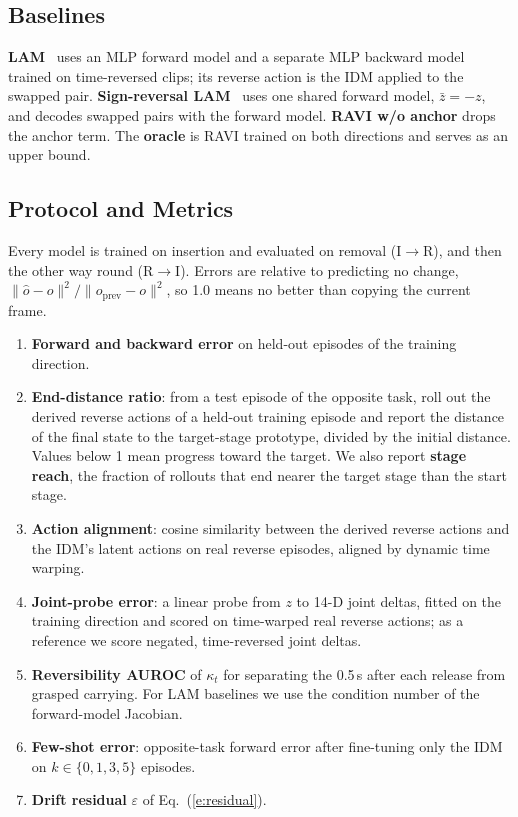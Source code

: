 \documentclass{jcse}
\newcommand{\method}{RAVI}
\newcommand{\zb}{\bar{z}}
\begin{document}
\subsection{Baselines}
\textbf{LAM}~\cite{schmidt2024lapo} uses an MLP forward model and a separate MLP backward model trained on time-reversed clips; its reverse action is the IDM applied to the swapped pair.
\textbf{Sign-reversal LAM}~\cite{tang2026alam} uses one shared forward model, $\zb=-z$, and decodes swapped pairs with the forward model.
\textbf{{\method} w/o anchor} drops the anchor term.
The \textbf{oracle} is {\method} trained on both directions and serves as an upper bound.

\subsection{Protocol and Metrics}
Every model is trained on insertion and evaluated on removal (I$\to$R), and then the other way round (R$\to$I).
Errors are relative to predicting no change, $\|\hat o-o\|^2/\|o_{\mathrm{prev}}-o\|^2$, so 1.0 means no better than copying the current frame.
\begin{enumerate}
	\item \textbf{Forward and backward error} on held-out episodes of the training direction.
	\item \textbf{End-distance ratio}: from a test episode of the opposite task, roll out the derived reverse actions of a held-out training episode and report the distance of the final state to the target-stage prototype, divided by the initial distance. Values below 1 mean progress toward the target. We also report \textbf{stage reach}, the fraction of rollouts that end nearer the target stage than the start stage.
	\item \textbf{Action alignment}: cosine similarity between the derived reverse actions and the IDM's latent actions on real reverse episodes, aligned by dynamic time warping.
	\item \textbf{Joint-probe error}: a linear probe from $z$ to 14-D joint deltas, fitted on the training direction and scored on time-warped real reverse actions; as a reference we score negated, time-reversed joint deltas.
	\item \textbf{Reversibility AUROC} of $\kappa_t$ for separating the 0.5\,s after each release from grasped carrying. For LAM baselines we use the condition number of the forward-model Jacobian.
	\item \textbf{Few-shot error}: opposite-task forward error after fine-tuning only the IDM on $k\in\{0,1,3,5\}$ episodes.
	\item \textbf{Drift residual} $\varepsilon$ of Eq.~(\ref{e:residual}).
\end{enumerate}
\end{document}
